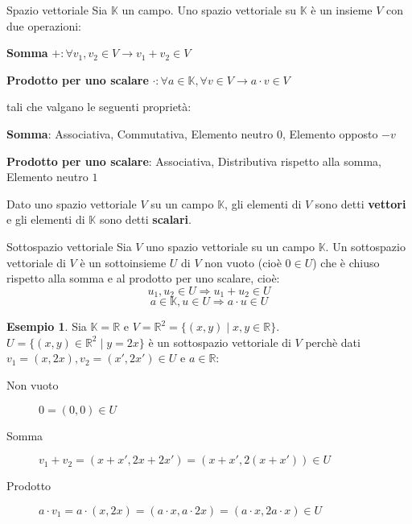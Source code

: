 \documentclass[a4paper]{article}
\theoremstyle{definition}
\newtheorem*{es}{Esempio}
\begin{document}
\begin{deff}{Spazio vettoriale}{}
	Sia $\mathbb{K}$ un campo. Uno spazio vettoriale su $\mathbb{K}$ è un insieme $V$ con due operazioni:
	\begin{description}
		\item \textbf{Somma} $+: \forall v_1, v_2 \in V \rightarrow v_1 + v_2 \in V$
		\item \textbf{Prodotto per uno scalare} $\cdot: \forall a \in \mathbb{K}, \forall v \in V \rightarrow a \cdot v \in V$
	\end{description}
	tali che valgano le seguenti proprietà:
	\begin{description}
		\item \textbf{Somma}: Associativa, Commutativa, Elemento neutro $0$, Elemento opposto $-v$
		\item \textbf{Prodotto per uno scalare}: Associativa, Distributiva rispetto alla somma, Elemento neutro $1$
	\end{description}
\end{deff}
Dato uno spazio vettoriale $V$ su un campo $\mathbb{K}$, gli elementi di $V$ sono detti \textbf{vettori} e gli elementi di $\mathbb{K}$ sono detti \textbf{scalari}.

\begin{deff}{Sottospazio vettoriale}{}
	Sia $V$ uno spazio vettoriale su un campo $\mathbb{K}$. Un sottospazio vettoriale di $V$ è un sottoinsieme $U$ di $V$ non vuoto (cioè $0 \in U$) che è chiuso rispetto alla somma e al prodotto per uno scalare, cioè:
	\[ u_1, u_2 \in U \Rightarrow u_1 + u_2 \in U \]
	\[ a \in \mathbb{K}, u \in U \Rightarrow a \cdot u \in U \]
\end{deff}

\begin{es}
	Sia $\mathbb{K} = \mathbb{R}$ e $V = \mathbb{R}^2 = \{(x, y) \mid x, y \in \mathbb{R}\}$. \\
	$U = \{(x, y) \in \mathbb{R}^2 \mid y = 2x\}$ è un sottospazio vettoriale di $V$ perchè dati $v_1 = (x, 2x), v_2 = (x', 2x') \in U$ e $a \in \mathbb{R}$:
	\begin{description}
		\item[Non vuoto] $0 = (0, 0) \in U$
		\item[Somma] $v_1 + v_2 = (x + x', 2x + 2x') = (x + x', 2(x + x')) \in U$
		\item[Prodotto] $a \cdot v_1 = a \cdot (x, 2x) = (a \cdot x, a \cdot 2x) = (a \cdot x, 2a \cdot x) \in U$
	\end{description}
\end{es}
\end{document}
